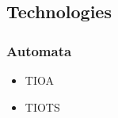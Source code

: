 \subsection{Technologies} %


\subsubsection{Automata}\label{subsub:automata}



\begin{itemize}
    \item TIOA
    \item TIOTS
\end{itemize}
